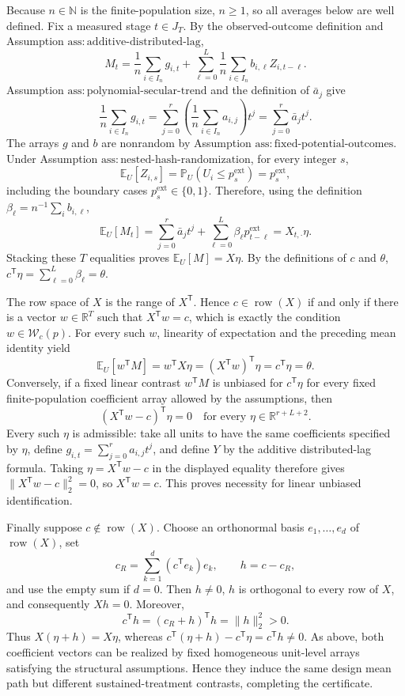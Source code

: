 Because \(n\in\mathbb N\) is the finite-population size, \(n\ge1\), so all averages below are well defined.  Fix a measured stage \(t\in J_T\).  By the observed-outcome definition and Assumption \(\mathrm{ass:additive\text{-}distributed\text{-}lag}\),
\[
 M_t=\frac1n\sum_{i\in I_n}g_{i,t}
     +\sum_{\ell=0}^{L}\frac1n\sum_{i\in I_n}b_{i,\ell}Z_{i,t-\ell}.
\]
Assumption \(\mathrm{ass:polynomial\text{-}secular\text{-}trend}\) and the definition of \(\bar a_j\) give
\[
 \frac1n\sum_{i\in I_n}g_{i,t}
 =\sum_{j=0}^{r}\left(\frac1n\sum_{i\in I_n}a_{i,j}\right)t^j
 =\sum_{j=0}^{r}\bar a_jt^j.
\]
The arrays \(g\) and \(b\) are nonrandom by Assumption \(\mathrm{ass:fixed\text{-}potential\text{-}outcomes}\).  Under Assumption \(\mathrm{ass:nested\text{-}hash\text{-}randomization}\), for every integer \(s\),
\[
 \mathbb E_U[Z_{i,s}]
 =\mathbb P_U(U_i\le p_s^{\mathrm{ext}})
 =p_s^{\mathrm{ext}},
\]
including the boundary cases \(p_s^{\mathrm{ext}}\in\{0,1\}\).  Therefore, using the definition \(\beta_\ell=n^{-1}\sum_i b_{i,\ell}\),
\[
 \mathbb E_U[M_t]
 =\sum_{j=0}^{r}\bar a_jt^j
   +\sum_{\ell=0}^{L}\beta_\ell p_{t-\ell}^{\mathrm{ext}}
 =X_{t,\cdot}\eta.
\]
Stacking these \(T\) equalities proves \(\mathbb E_U[M]=X\eta\).  By the definitions of \(c\) and \(\theta\), \(c^{\mathsf T}\eta=\sum_{\ell=0}^{L}\beta_\ell=\theta\).

The row space of \(X\) is the range of \(X^{\mathsf T}\).  Hence \(c\in\operatorname{row}(X)\) if and only if there is a vector \(w\in\mathbb R^T\) such that \(X^{\mathsf T}w=c\), which is exactly the condition \(w\in\mathcal W_c(p)\).  For every such \(w\), linearity of expectation and the preceding mean identity yield
\[
 \mathbb E_U[w^{\mathsf T}M]
 =w^{\mathsf T}X\eta
 =(X^{\mathsf T}w)^{\mathsf T}\eta
 =c^{\mathsf T}\eta
 =\theta.
\]
Conversely, if a fixed linear contrast \(w^{\mathsf T}M\) is unbiased for \(c^{\mathsf T}\eta\) for every fixed finite-population coefficient array allowed by the assumptions, then
\[
 (X^{\mathsf T}w-c)^{\mathsf T}\eta=0
 \quad\text{for every }\eta\in\mathbb R^{r+L+2}.
\]
Every such \(\eta\) is admissible: take all units to have the same coefficients specified by \(\eta\), define \(g_{i,t}=\sum_{j=0}^{r}a_{i,j}t^j\), and define \(Y\) by the additive distributed-lag formula.  Taking \(\eta=X^{\mathsf T}w-c\) in the displayed equality therefore gives \(\lVert X^{\mathsf T}w-c\rVert_2^2=0\), so \(X^{\mathsf T}w=c\).  This proves necessity for linear unbiased identification.

Finally suppose \(c\notin\operatorname{row}(X)\).  Choose an orthonormal basis \(e_1,\ldots,e_d\) of \(\operatorname{row}(X)\), set
\[
 c_R=\sum_{k=1}^{d}(c^{\mathsf T}e_k)e_k,
 \qquad h=c-c_R,
\]
and use the empty sum if \(d=0\).  Then \(h\ne0\), \(h\) is orthogonal to every row of \(X\), and consequently \(Xh=0\).  Moreover,
\[
 c^{\mathsf T}h=(c_R+h)^{\mathsf T}h=\lVert h\rVert_2^2>0.
\]
Thus \(X(\eta+h)=X\eta\), whereas \(c^{\mathsf T}(\eta+h)-c^{\mathsf T}\eta=c^{\mathsf T}h\ne0\).  As above, both coefficient vectors can be realized by fixed homogeneous unit-level arrays satisfying the structural assumptions.  Hence they induce the same design mean path but different sustained-treatment contrasts, completing the certificate.